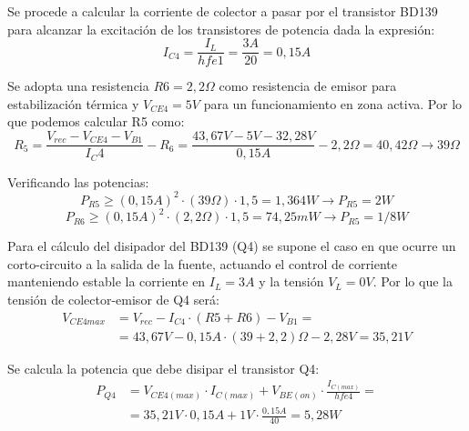 Se procede a calcular la corriente de colector a pasar por el transistor BD139 para alcanzar la excitación de los transistores de potencia dada la expresión:
\begin{equation}
I_{C4}=\frac{I_L}{hfe1}=\frac{3A}{20}=0,15A
\end{equation} \par 

Se adopta una resistencia $R6=2,2\Omega$ como resistencia de emisor para estabilización térmica y $V_{CE4}=5V$ para un funcionamiento en zona activa. Por lo que podemos calcular R5 como:
\begin{equation}
R_5=\frac{V_{rec}-V_{CE4}-V_{B1}}{I_C4}-R_6=\frac{43,67 V-5V-32,28V}{0,15A}-2,2\Omega=40,42\Omega \to 39\Omega 
\end{equation} \par 

Verificando las potencias:
\begin{equation}
P_{R5}\geq (0,15A)^2\cdot (39\Omega)\cdot 1,5=1,364 W \to P_{R5}=2W
\end{equation}
\begin{equation}
P_{R6}\geq (0,15A)^2\cdot (2,2\Omega)\cdot 1,5=74,25 mW \to P_{R5}=1/8W
\end{equation} \par

Para el cálculo del disipador del BD139 (Q4) se supone el caso en que ocurre un corto-circuito a la salida de la fuente, actuando el control de corriente manteniendo estable la corriente en $I_L=3A$ y la tensión $V_L=0V$. Por lo que la tensión de colector-emisor de Q4 será:
\begin{equation}
\begin{split}
V_{CE4max}&=V_{rec}-I_{C4}\cdot (R5+R6)-V_{B1}=\\
&=43,67V-0,15A\cdot (39+2,2)\Omega -2,28V=35,21 V
\end{split}
\end{equation} \par 

Se calcula la potencia que debe disipar el transistor Q4:
\begin{equation}
\begin{split}
P_{Q4}&=V_{CE4(max)}\cdot I_{C(max)}+V_{BE(on)}\cdot \frac{I_{C(max)}}{hfe4}=\\
&=35,21V\cdot 0,15A+1V\cdot \frac{0,15A}{40}=5,28W
\end{split}
\end{equation} \par 

